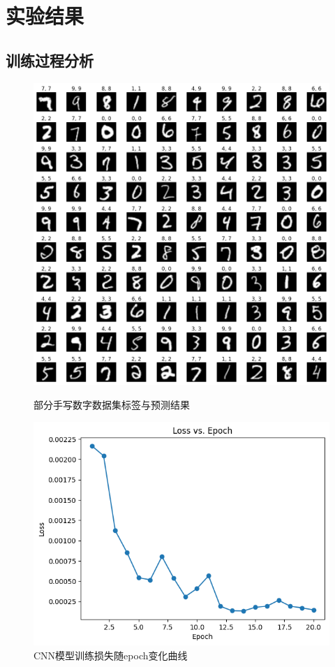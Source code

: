 \section{实验结果}\label{sec:results}

\subsection{训练过程分析}

\begin{figure}[!htp]
	\begin{minipage}{0.5\textwidth}
		\centering
		\includegraphics[height=0.25\textheight]{figures/dataset_predictions}
		\caption{部分手写数字数据集标签与预测结果}
	\end{minipage}\hfill
	\begin{minipage}{0.5\textwidth}
		\centering
		\includegraphics[height=0.25\textheight]{figures/loss_curve}
		\caption{CNN模型训练损失随epoch变化曲线}
	\end{minipage}
\end{figure}

